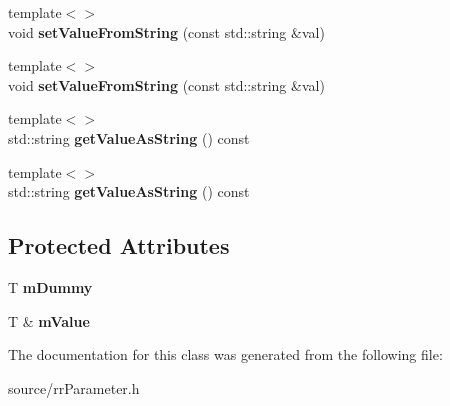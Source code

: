 \begin{DoxyCompactItemize}
\item 
\hypertarget{classrr_1_1_parameter_a045fb1e245ca5a88aa7446d921423672}{{\footnotesize template$<$$>$ }\\void {\bfseries set\-Value\-From\-String} (const std\-::string \&val)}\label{classrr_1_1_parameter_a045fb1e245ca5a88aa7446d921423672}

\item 
\hypertarget{classrr_1_1_parameter_ae1ead532e1b99831a97230c33759df18}{{\footnotesize template$<$$>$ }\\void {\bfseries set\-Value\-From\-String} (const std\-::string \&val)}\label{classrr_1_1_parameter_ae1ead532e1b99831a97230c33759df18}

\item 
\hypertarget{classrr_1_1_parameter_aa0924193027571514de2a5aadf71d1bd}{{\footnotesize template$<$$>$ }\\std\-::string {\bfseries get\-Value\-As\-String} () const}\label{classrr_1_1_parameter_aa0924193027571514de2a5aadf71d1bd}

\item 
\hypertarget{classrr_1_1_parameter_abc16de2195d8369b8f481add5e232880}{{\footnotesize template$<$$>$ }\\std\-::string {\bfseries get\-Value\-As\-String} () const}\label{classrr_1_1_parameter_abc16de2195d8369b8f481add5e232880}

\end{DoxyCompactItemize}
\subsection*{Protected Attributes}
\begin{DoxyCompactItemize}
\item 
\hypertarget{classrr_1_1_parameter_ae1b5d7f3141bc09bd98715bd898822a6}{T {\bfseries m\-Dummy}}\label{classrr_1_1_parameter_ae1b5d7f3141bc09bd98715bd898822a6}

\item 
\hypertarget{classrr_1_1_parameter_a4fef6c7e6d57dfbbe571bf8d410f894d}{T \& {\bfseries m\-Value}}\label{classrr_1_1_parameter_a4fef6c7e6d57dfbbe571bf8d410f894d}

\end{DoxyCompactItemize}


The documentation for this class was generated from the following file\-:\begin{DoxyCompactItemize}
\item 
source/rr\-Parameter.\-h\end{DoxyCompactItemize}
